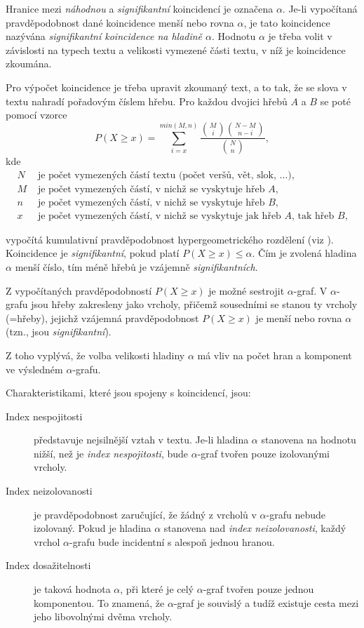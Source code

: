 \documentclass[dp.tex]{subfiles}
\begin{document}
Hranice mezi \textit{náhodnou} a \textit{signifikantní} koincidencí je označena $\alpha $. Je-li vypočítaná pravděpodobnost dané koincidence menší nebo rovna $\alpha $, je tato koincidence nazývána \textit{signifikantní koincidence na hladině $\alpha $}. Hodnotu $\alpha $ je třeba volit v závislosti na typech textu a velikosti vymezené části textu, v níž je koincidence zkoumána.

Pro výpočet koincidence je třeba upravit zkoumaný text, a to tak, že se slova v textu nahradí pořadovým číslem hřebu. Pro každou dvojici hřebů $A$ a $B$ se poté pomocí vzorce
\begin{equation}
P(X \geq x)=\sum_{i=x}^{min{\left(  M, n \right) }} \frac{\binom{M}{i}\binom{N-M}{n-i}}{\binom{N}{n}},
\end{equation}
kde 
\begin{align*}
	N & \text{ je počet vymezených částí textu (počet veršů, vět, slok, \ldots),}\\
	M & \text{ je počet vymezených částí, v nichž se vyskytuje hřeb $A$,}\\
	n & \text{ je počet vymezených částí, v nichž se vyskytuje hřeb $B$,}\\
	x & \text{ je počet vymezených částí, v nichž se vyskytuje jak hřeb  $A$, tak hřeb $B$,}
\end{align*}  

vypočítá kumulativní pravděpodobnost hypergeometrického rozdělení (viz \cite[str. 307]{Wimmer2003}). Koincidence je \textit{signifikantní}, pokud platí $P(X \geq x)\leq \alpha$. Čím je zvolená hladina $\alpha$ menší číslo, tím méně hřebů je vzájemně \textit{signifikantních}.

Z vypočítaných pravděpodobností $P(X \geq x)$ je možné sestrojit $\alpha$-graf. V $\alpha$-grafu jsou hřeby zakresleny jako vrcholy, přičemž sousedními se stanou ty vrcholy (=hřeby), jejichž vzájemná pravděpodobnost $P(X \geq x)$ je menší nebo rovna $\alpha$ (tzn., jsou \textit{signifikantní}).

Z toho vyplývá, že volba velikosti hladiny $\alpha$ má vliv na počet hran a komponent ve výsledném $\alpha$-grafu. 

Charakteristikami, které jsou spojeny s koincidencí, jsou:
\begin{description}
	\item[Index nespojitosti] představuje nejsilnější vztah v textu. Je-li hladina $\alpha$ stanovena na hodnotu nižší, než je \textit{index nespojitosti}, bude $\alpha$-graf tvořen pouze izolovanými vrcholy.
	\item[Index neizolovanosti] je pravděpodobnost zaručující, že žádný z vrcholů v $\alpha$-grafu nebude izolovaný. Pokud je hladina $\alpha$ stanovena nad \textit{index neizolovanosti}, každý vrchol $\alpha$-grafu bude incidentní s alespoň jednou hranou.
	\item[Index dosažitelnosti] je taková hodnota $\alpha$, při které je celý $\alpha$-graf tvořen pouze jednou komponentou. To znamená, že $\alpha$-graf je souvislý a tudíž existuje cesta mezi jeho libovolnými dvěma vrcholy.
\end{description}
\end{document}
